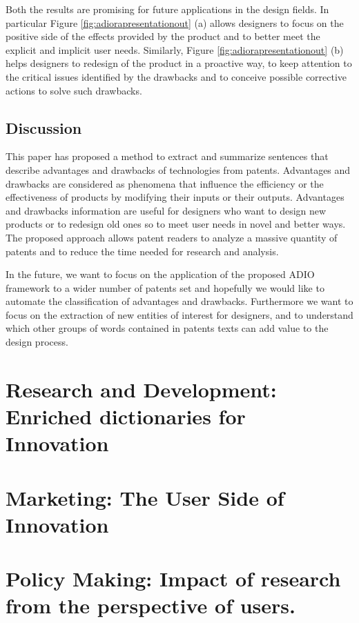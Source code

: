 \documentclass[]{book}
\begin{document}
Both the results are promising for future applications in the design
fields. In particular Figure \ref{fig:adiorapresentationout} (a) allows
designers to focus on the positive side of the effects provided by the
product and to better meet the explicit and implicit user needs.
Similarly, Figure \ref{fig:adiorapresentationout} (b) helps designers to
redesign of the product in a proactive way, to keep attention to the
critical issues identified by the drawbacks and to conceive possible
corrective actions to solve such drawbacks.

\section{Discussion}\label{discussion}

This paper has proposed a method to extract and summarize sentences that
describe advantages and drawbacks of technologies from patents.
Advantages and drawbacks are considered as phenomena that influence the
efficiency or the effectiveness of products by modifying their inputs or
their outputs. Advantages and drawbacks information are useful for
designers who want to design new products or to redesign old ones so to
meet user needs in novel and better ways. The proposed approach allows
patent readers to analyze a massive quantity of patents and to reduce
the time needed for research and analysis.

In the future, we want to focus on the application of the proposed ADIO
framework to a wider number of patents set and hopefully we would like
to automate the classification of advantages and drawbacks. Furthermore
we want to focus on the extraction of new entities of interest for
designers, and to understand which other groups of words contained in
patents texts can add value to the design process.

\chapter{Research and Development: Enriched dictionaries for
Innovation}\label{research-and-development-enriched-dictionaries-for-innovation}

\chapter{Marketing: The User Side of
Innovation}\label{marketing-the-user-side-of-innovation}

\chapter{Policy Making: Impact of research from the perspective of
users.}\label{policy-making-impact-of-research-from-the-perspective-of-users.}
\end{document}
